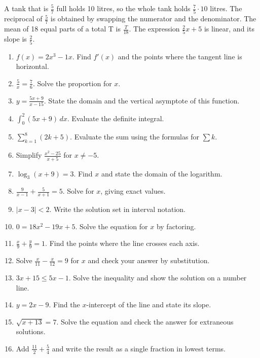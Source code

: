 \documentclass[11pt]{article}
\begin{document}
A tank that is \label{eq006}$\frac{5}{7}$ full holds 10 litres, so the whole tank holds \label{eq007}$\frac{7}{5} \cdot 10$ litres. The reciprocal of \label{eq008}$\frac{5}{7}$ is obtained by swapping the numerator and the denominator. The mean of 18 equal parts of a total T is \label{eq009}$\frac{T}{18}$. The expression \label{eq010}$\frac{2}{5}x + 5$ is linear, and its slope is \label{eq011}$\frac{2}{5}$.
\begin{enumerate}
\setcounter{enumi}{0}
\setlength{\itemsep}{8pt}
\item \label{eq012}$f(x) = 2x^3 - 1x$. Find $f'(x)$ and the points where the tangent line is horizontal.
\item \label{eq013}$\frac{5}{x} = \frac{7}{6}$. Solve the proportion for $x$.
\item \label{eq014}$y = \frac{5x + 9}{x - 15}$. State the domain and the vertical asymptote of this function.
\item \label{eq015}$\int_0^2 (5x + 9)\,dx$. Evaluate the definite integral.
\item \label{eq016}$\sum_{k=1}^{8} (2k + 5)$. Evaluate the sum using the formulas for $\sum k$.
\item Simplify \label{eq017}$\frac{x^2 - 25}{x + 5}$ for $x \neq -5$.
\item \label{eq018}$\log_{3}(x + 9) = 3$. Find $x$ and state the domain of the logarithm.
\item \label{eq019}$\frac{9}{x - 1} + \frac{5}{x + 1} = 5$. Solve for $x$, giving exact values.
\item \label{eq020}$|x - 3| < 2$. Write the solution set in interval notation.
\item \label{eq021}$0 = 18x^2 - 19x + 5$. Solve the equation for $x$ by factoring.
\item \label{eq022}$\frac{x}{9} + \frac{y}{9} = 1$. Find the points where the line crosses each axis.
\item Solve \label{eq023}$\frac{x}{11} - \frac{x}{12} = 9$ for $x$ and check your answer by substitution.
\item \label{eq024}$3x + 15 \le 5x - 1$. Solve the inequality and show the solution on a number line.
\item \label{eq025}$y = 2x - 9$. Find the $x$-intercept of the line and state its slope.
\item \label{eq026}$\sqrt{x + 13} = 7$. Solve the equation and check the answer for extraneous solutions.
\item Add \label{eq027}$\frac{11}{2} + \frac{5}{4}$ and write the result as a single fraction in lowest terms.
\end{enumerate}
\end{document}
